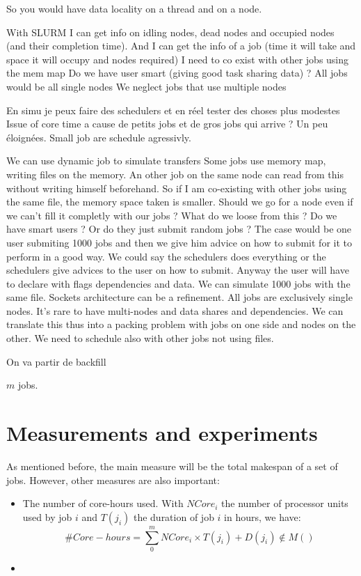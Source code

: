 \documentclass[a4paper]{article}
\begin{document}
So you would have data locality on a thread and on a node.

With SLURM I can get info on idling nodes, dead nodes and occupied nodes (and their completion time). And I can get the info of a job (time it will take and space it will occupy and nodes required)
I need to co exist with other jobs using the mem map
Do we have user smart (giving good task sharing data) ?
All jobs would be all single nodes
We neglect jobs that use multiple nodes

En simu je peux faire des schedulers et en réel tester des choses plus modestes
Issue of core time a cause de petits jobs et de gros jobs qui arrive ? Un peu éloignées. Small job are schedule agressivly.	

We can use dynamic job to simulate transfers
Some jobs use memory map, writing files on the memory. An other job on the same node can read from this without writing himself beforehand. So if I am co-existing with other jobs using the same file, the memory space taken is smaller.
Should we go for a node even if we can't fill it completly with our jobs ? What do we loose from this ?
Do we have smart users ? Or do they just submit random jobs ? The case would be one user submiting 1000 jobs and then we give him advice on how to submit for it to perform in a good way. We could say the schedulers does everything or the schedulers give advices to the user on how to submit. Anyway the user will have to declare with flags dependencies and data. We can simulate 1000 jobs with the same file.
Sockets architecture can be a refinement.
All jobs are exclusively single nodes. It's rare to have multi-nodes and data shares and dependencies. We can translate this thus into a packing problem with jobs on one side and nodes on the other.
We need to schedule also with other jobs not using files.

On va partir de backfill

$m$ jobs.

\section{Measurements and experiments}

As mentioned before, the main measure will be the total makespan of a set of jobs.
However, other measures are also important:
\begin{itemize}
	\item	The number of core-hours used. With $NCore_i$ the number of processor units used by job $i$ and $T(j_i)$ the duration of job $i$ in hours, we have:
		$$
			\#Core-hours = \sum^{m}_{0} NCore_i \times T(j_i) + D(j_i) \notin M()
		$$
	\item	
\end{itemize}
\end{document}

